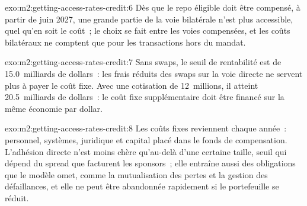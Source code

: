 \begin{solution}{exo:m2:getting-access-rates-credit:6}
Dès que le repo éligible doit être compensé, à partir de juin 2027, une grande partie de la voie bilatérale
n'est plus accessible, quel qu'en soit le coût~; le choix se fait entre les voies compensées, et les
coûts bilatéraux ne comptent que pour les transactions hors du mandat.
\end{solution}

\begin{solution}{exo:m2:getting-access-rates-credit:7}
Sans swaps, le seuil de rentabilité est de 15.0~milliards de dollars~: les frais réduits des swaps sur la voie directe
ne servent plus à payer le coût fixe. Avec une cotisation de 12~millions, il atteint 20.5~milliards de dollars~:
le coût fixe supplémentaire doit être financé sur la même économie par dollar.
\end{solution}

\begin{solution}{exo:m2:getting-access-rates-credit:8}
Les coûts fixes reviennent chaque année~: personnel, systèmes, juridique et capital placé dans le fonds de
compensation. L'adhésion directe n'est moins chère qu'au-delà d'une certaine taille, seuil qui dépend du
spread que facturent les sponsors~; elle entraîne aussi des obligations que le modèle omet, comme
la mutualisation des pertes et la gestion des défaillances, et elle ne peut être abandonnée rapidement si le
portefeuille se réduit.
\end{solution}

